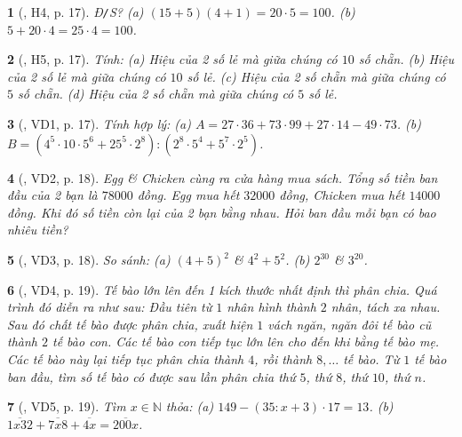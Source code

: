 \documentclass{article}
\newtheorem{baitoan}{}
\begin{document}
\begin{baitoan}[\cite{Binh_boi_duong_Toan_6_tap_1}, H4, p. 17]
	{\rm Đ{\tt/}S?} (a) $(15 + 5)(4 + 1) = 20\cdot5 = 100$. (b) $5 + 20\cdot4 = 25\cdot4 = 100$.
\end{baitoan}

\begin{baitoan}[\cite{Binh_boi_duong_Toan_6_tap_1}, H5, p. 17]
	Tính: (a) Hiệu của 2 số lẻ mà giữa chúng có $10$ số chẵn. (b) Hiệu của 2 số lẻ mà giữa chúng có $10$ số lẻ. (c) Hiệu của 2 số chẵn mà giữa chúng có $5$ số chẵn. (d) Hiệu của 2 số chẵn mà giữa chúng có $5$ số lẻ.
\end{baitoan}

\begin{baitoan}[\cite{Binh_boi_duong_Toan_6_tap_1}, VD1, p. 17]
	Tính hợp lý: (a) $A = 27\cdot36 + 73\cdot99 + 27\cdot14 - 49\cdot73$. (b) $B = (4^5\cdot10\cdot5^6 + 25^5\cdot2^8):(2^8\cdot5^4 + 5^7\cdot2^5)$.
\end{baitoan}

\begin{baitoan}[\cite{Binh_boi_duong_Toan_6_tap_1}, VD2, p. 18]
	Egg \& Chicken cùng ra cửa hàng mua sách. Tổng số tiền ban đầu của 2 bạn là $78000$ đồng. Egg mua hết $32000$ đồng, Chicken mua hết $14000$ đồng. Khi đó số tiền còn lại của 2 bạn bằng nhau. Hỏi ban đầu mỗi bạn có bao nhiêu tiền?
\end{baitoan}

\begin{baitoan}[\cite{Binh_boi_duong_Toan_6_tap_1}, VD3, p. 18]
	So sánh: (a) $(4 + 5)^2$ \& $4^2 + 5^2$. (b) $2^{30}$ \& $3^{20}$.
\end{baitoan}

\begin{baitoan}[\cite{Binh_boi_duong_Toan_6_tap_1}, VD4, p. 19]
	Tế bào lớn lên đến 1 kích thước nhất định thì phân chia. Quá trình đó diễn ra như sau: Đầu tiên từ $1$ nhân hình thành $2$ nhân, tách xa nhau. Sau đó chất tế bào được phân chia, xuất hiện $1$ vách ngăn, ngăn đôi tế bào cũ thành $2$ tế bào con. Các tế bào con tiếp tục lớn lên cho đến khi bằng tế bào mẹ. Các tế bào này lại tiếp tục phân chia thành $4$, rồi thành $8,\ldots$ tế bào. Từ $1$ tế bào ban đầu, tìm số tế bào có được sau lần phân chia thứ $5$, thứ $8$, thứ $10$, thứ $n$.
\end{baitoan}

\begin{baitoan}[\cite{Binh_boi_duong_Toan_6_tap_1}, VD5, p. 19]
	Tìm $x\in\mathbb{N}$ thỏa: (a) $149 - (35:x + 3)\cdot17 = 13$. (b) $\overline{1x32} + \overline{7x8} + \overline{4x} = \overline{200x}$.
\end{baitoan}
\end{document}
